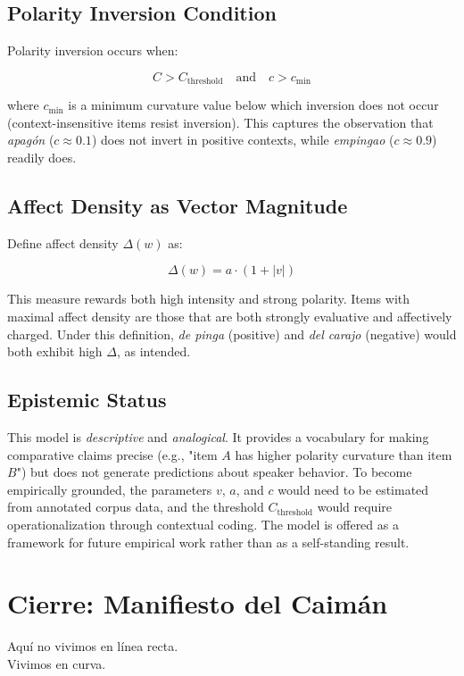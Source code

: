 \documentclass[12pt]{article}
\begin{document}
\subsection*{Polarity Inversion Condition}

Polarity inversion occurs when:

\[
C > C_{\text{threshold}} \quad \text{and} \quad c > c_{\text{min}}
\]

where $c_{\text{min}}$ is a minimum curvature value below which inversion does not occur (context-insensitive items resist inversion). This captures the observation that \textit{apagón} ($c \approx 0.1$) does not invert in positive contexts, while \textit{empingao} ($c \approx 0.9$) readily does.

\subsection*{Affect Density as Vector Magnitude}

Define affect density $\Delta(w)$ as:

\[
\Delta(w) = a \cdot (1 + |v|)
\]

This measure rewards both high intensity and strong polarity. Items with maximal affect density are those that are both strongly evaluative and affectively charged. Under this definition, \textit{de pinga} (positive) and \textit{del carajo} (negative) would both exhibit high $\Delta$, as intended.

\subsection*{Epistemic Status}

This model is \textit{descriptive} and \textit{analogical}. It provides a vocabulary for making comparative claims precise (e.g., "item $A$ has higher polarity curvature than item $B$") but does not generate predictions about speaker behavior. To become empirically grounded, the parameters $v$, $a$, and $c$ would need to be estimated from annotated corpus data, and the threshold $C_{\text{threshold}}$ would require operationalization through contextual coding. The model is offered as a framework for future empirical work rather than as a self-standing result.

\section*{Cierre: Manifiesto del Caimán}

Aquí no vivimos en línea recta.\\
Vivimos en curva.
\end{document}
